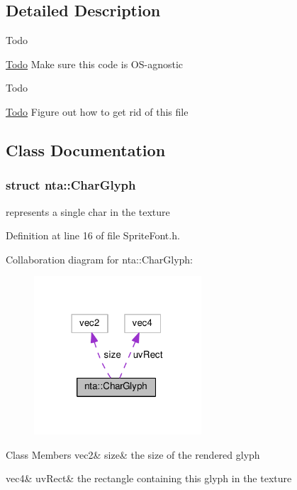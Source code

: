 \subsection{Detailed Description}
\begin{DoxyRefDesc}{Todo}
\item[\hyperlink{todo__todo000006}{Todo}]Make sure this code is O\+S-\/agnostic \end{DoxyRefDesc}


\begin{DoxyRefDesc}{Todo}
\item[\hyperlink{todo__todo000012}{Todo}]Figure out how to get rid of this file \end{DoxyRefDesc}


\subsection{Class Documentation}
\label{structnta_1_1CharGlyph}
\subsubsection{struct nta\+:\+:Char\+Glyph}
represents a single char in the texture 

Definition at line 16 of file Sprite\+Font.\+h.



Collaboration diagram for nta\+:\+:Char\+Glyph\+:\nopagebreak
\begin{figure}[H]
\begin{center}
\leavevmode
\includegraphics[width=177pt]{df/ddc/structnta_1_1CharGlyph__coll__graph}
\end{center}
\end{figure}
\begin{DoxyFields}{Class Members}
\mbox{\label{namespacenta_aa2a40e6fe48ffadb4c7c95af7e82db91}} 
vec2&
size&
the size of the rendered glyph \\
\hline

\mbox{\label{namespacenta_a46d9ea9c38c8bf5e1c1679e938019f53}} 
vec4&
uvRect&
the rectangle containing this glyph in the texture \\
\hline

\end{DoxyFields}
\label{structnta_1_1GLTexture}
